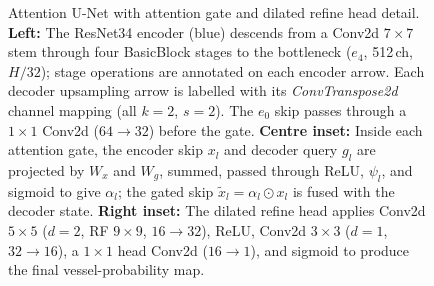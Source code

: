 \documentclass[11pt,letterpaper]{article}
\begin{document}
\begin{figure}[htbp]
{%
}
\caption{Attention U-Net with attention gate and dilated refine head detail. \textbf{Left:} The ResNet34 encoder (blue) descends from a Conv2d $7{\times}7$ stem through four BasicBlock stages to the bottleneck ($e_4$, 512\,ch, $H/32$); stage operations are annotated on each encoder arrow. Each decoder upsampling arrow is labelled with its \emph{ConvTranspose2d} channel mapping (all $k{=}2$, $s{=}2$). The $e_0$ skip passes through a $1{\times}1$ Conv2d ($64{\to}32$) before the gate. \textbf{Centre inset:} Inside each attention gate, the encoder skip $x_l$ and decoder query $g_l$ are projected by $W_x$ and $W_g$, summed, passed through ReLU, $\psi_l$, and sigmoid to give $\alpha_l$; the gated skip $\tilde{x}_l = \alpha_l \odot x_l$ is fused with the decoder state. \textbf{Right inset:} The dilated refine head applies Conv2d $5{\times}5$ ($d{=}2$, RF $9{\times}9$, $16{\to}32$), ReLU, Conv2d $3{\times}3$ ($d{=}1$, $32{\to}16$), a $1{\times}1$ head Conv2d ($16{\to}1$), and sigmoid to produce the final vessel-probability map.}
\label{fig:architecture-simple}
\end{figure}
\end{document}
